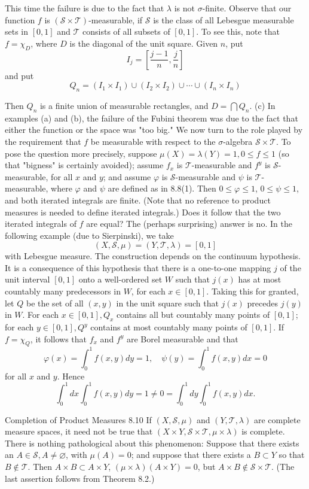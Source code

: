 This time the failure is due to the fact that $\lambda$ is not $\sigma$-finite.
Observe that our function $f$ is $(\mathscr{S} \times \mathscr{T})$-measurable, if $\mathscr{S}$ is the class of all Lebesgue measurable sets in $[0,1]$ and $\mathscr{T}$ consists of all subsets of $[0,1]$.
To see this, note that $f=\chi_D$, where $D$ is the diagonal of the unit square. Given $n$, put
$$
I_j=\left[\frac{j-1}{n}, \frac{j}{n}\right]
$$
and put
$$
Q_n=\left(I_1 \times I_1\right) \cup\left(I_2 \times I_2\right) \cup \cdots \cup\left(I_n \times I_n\right)
$$

Then $Q_n$ is a finite union of measurable rectangles, and $D=\bigcap Q_n$.
(c) In examples (a) and (b), the failure of the Fubini theorem was due to the fact that either the function or the space was "too big." We now turn to the role played by the requirement that $f$ be measurable with respect to the $\sigma$-algebra $\mathscr{S} \times \mathscr{T}$.
To pose the question more precisely, suppose $\mu(X)=\lambda(Y)=1,0 \leq f \leq 1$ (so that "bigness" is certainly avoided); assume $f_x$ is $\mathscr{T}$-measurable and $f^y$ is $\mathscr{S}$-measurable, for all $x$ and $y$; and assume $\varphi$ is $\mathscr{S}$-measurable and $\psi$ is $\mathscr{T}$-measurable, where $\varphi$ and $\psi$ are defined as in 8.8(1). Then $0 \leq \varphi \leq 1$, $0 \leq \psi \leq 1$, and both iterated integrals are finite. (Note that no reference to product measures is needed to define iterated integrals.) Does it follow that the two iterated integrals of $f$ are equal?
The (perhaps surprising) answer is no.
In the following example (due to Sierpinski), we take
$$
(X, \mathscr{S}, \mu)=(Y, \mathscr{T}, \lambda)=[0,1]
$$
with Lebesgue measure. The construction depends on the continuum hypothesis. It is a consequence of this hypothesis that there is a one-to-one mapping $j$ of the unit interval $[0,1]$ onto a well-ordered set $W$ such that $j(x)$ has at most countably many predecessors in $W$, for each $x \in[0,1]$. Taking this for granted, let $Q$ be the set of all $(x, y)$ in the unit square such that $j(x)$ precedes $j(y)$ in $W$. For each $x \in[0,1], Q_x$ contains all but countably many points of $[0,1]$; for each $y \in[0,1], Q^y$ contains at most countably many points of $[0,1]$. If $f=\chi_Q$, it follows that $f_x$ and $f^y$ are Borel measurable and that
$$
\varphi(x)=\int_0^1 f(x, y) d y=1, \quad \psi(y)=\int_0^1 f(x, y) d x=0
$$
for all $x$ and $y$. Hence
$$
\int_0^1 d x \int_0^1 f(x, y) d y=1 \neq 0=\int_0^1 d y \int_0^1 f(x, y) d x .
$$

Completion of Product Measures
8.10 If $(X, \mathscr{S}, \mu)$ and $(Y, \mathscr{T}, \lambda)$ are complete measure spaces, it need not be true that $(X \times Y, \mathscr{S} \times \mathscr{T}, \mu \times \lambda)$ is complete. There is nothing pathological about this phenomenon: Suppose that there exists an $A \in \mathscr{S}, A \neq \varnothing$, with $\mu(A)=0$; and suppose that there exists a $B \subset Y$ so that $B \notin \mathscr{T}$. Then $A \times B \subset A \times Y$, $(\mu \times \lambda)(A \times Y)=0$, but $A \times B \notin \mathscr{S} \times \mathscr{T}$. (The last assertion follows from Theorem 8.2.)

